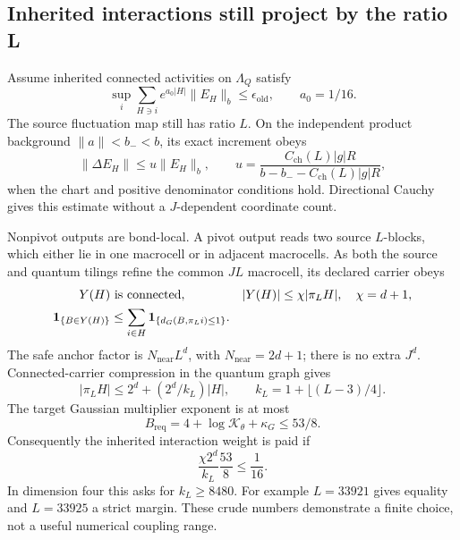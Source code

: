 \documentclass[11pt]{article}
\theoremstyle{remark}
\begin{document}
\subsection{Inherited interactions still project by the ratio L}

Assume inherited connected activities on $\Lambda_Q$ satisfy
\begin{equation}\label{ag-inherited-input}
 \sup_i\sum_{H\ni i}e^{a_0|H|}\|E_H\|_b
       \le\epsilon_{\mathrm{old}},\qquad a_0=1/16.
\end{equation}
The source fluctuation map still has ratio $L$. On the
independent product background $\|a\|<b_-<b$, its exact
increment obeys
\begin{equation}\label{ag-inherited-increment}
 \|\Delta E_H\|\le u\|E_H\|_b,\qquad
 u=\frac{C_{\mathrm{ch}}(L)|g|R}
        {b-b_- - C_{\mathrm{ch}}(L)|g|R},
\end{equation}
when the chart and positive denominator conditions hold.
Directional Cauchy gives this estimate without a
$J$-dependent coordinate count.

Nonpivot outputs are bond-local. A pivot output reads two
source $L$-blocks, which either lie in one macrocell or in
adjacent macrocells. As both the source and quantum tilings
refine the common $JL$ macrocell, its declared carrier obeys
\begin{align}
 Y(H)&\text{ is connected},&
 |Y(H)|&\le\chi|\pi_LH|,\quad\chi=d+1,\notag\\
 \mathbf1_{\{B\in Y(H)\}}
 &\le\sum_{i\in H}\mathbf1_{\{d_G(B,\pi_Li)\le1\}}.
                                                               \label{ag-pivot-geometry}
\end{align}
The safe anchor factor is $N_{\mathrm{near}}L^d$, with
$N_{\mathrm{near}}=2d+1$; there is no extra $J^d$.
Connected-carrier compression in the quantum graph gives
\begin{equation}\label{ag-quantum-compression}
 |\pi_LH|\le2^d+(2^d/k_L)|H|,\qquad
 k_L=1+\lfloor(L-3)/4\rfloor.
\end{equation}
The target Gaussian multiplier exponent is at most
\begin{equation}\label{ag-required-weight}
 B_{\mathrm{req}}=4+\log\mathcal K_\theta+\kappa_G
                  \le53/8.
\end{equation}
Consequently the inherited interaction weight is paid if
\begin{equation}\label{ag-L-choice}
 \frac{\chi2^d}{k_L}\frac{53}{8}\le\frac1{16}.
\end{equation}
In dimension four this asks for $k_L\ge8480$. For example
$L=33921$ gives equality and $L=33925$ a strict margin.
These crude numbers demonstrate a finite choice, not a
useful numerical coupling range.
\end{document}
